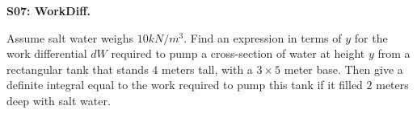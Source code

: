 \documentclass[12pt]{article}
\newcommand{\<}{\left\langle}
\renewcommand{\>}{\right\rangle}
\newcommand{\exerciseHeader}[4]{


  \vspace{0.5em}
  \textbf{#2}
  \vspace{0.5em}

}
\begin{document}
\begin{multicols}{2}
%

%
%
%

\exerciseHeader{2017 June 27}{S07: WorkDiff.}{
Use the work differential to express the work done in pumping a tank of
liquid as a definite integral.
}{2/3}

Assume salt water weighs \(10kN/m^3\).
Find an expression in terms of \(y\) for the work differential \(dW\)
required to pump a cross-section of water at height \(y\)
from a rectangular tank that stands \(4\) meters tall, with a
\(3\times 5\) meter base.
Then give a definite
integral equal to the work required to pump this tank if it filled
\(2\) meters deep with salt water.



%


\end{multicols}
\end{document}
